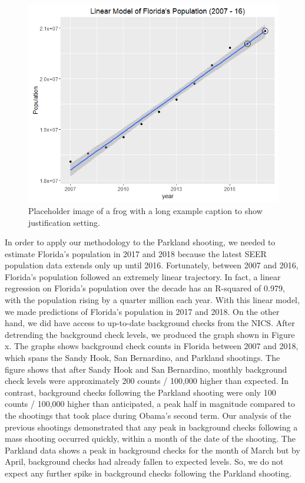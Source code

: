 \documentclass[9pt,twocolumn,twoside,lineno]{pnas-new}
\begin{document}
\begin{figure}
  \centering
  \includegraphics[width=\linewidth]{figures/florida}
  \caption{Placeholder image of a frog with a long example caption to show justification setting.}
  \label{fig:florida}
\end{figure}
	In order to apply our methodology to the Parkland shooting, we needed to estimate Florida’s population in 2017 and 2018 because the latest SEER population data extends only up until 2016. Fortunately, between 2007 and 2016, Florida’s population followed an extremely linear trajectory. In fact, a linear regression on Florida’s population over the decade has an R-squared of 0.979, with the population rising by a quarter million each year. With this linear model, we made predictions of Florida’s population in 2017 and 2018. On the other hand, we did have access to up-to-date background checks from the NICS. 
	After detrending the background check levels, we produced the graph shown in Figure x. The graphs shows background check counts in Florida between 2007 and 2018, which spans the Sandy Hook, San Bernardino, and Parkland shootings. The figure shows that after Sandy Hook and San Bernardino, monthly background check levels were approximately 200 counts / 100,000 higher than expected. In contrast, background checks following the Parkland shooting were only 100 counts / 100,000 higher than anticipated, a peak half in magnitude compared to the shootings that took place during Obama’s second term. Our analysis of the previous shootings demonstrated that any peak in background checks following a mass shooting occurred quickly, within a month of the date of the shooting. The Parkland data shows a peak in background checks for the month of March but by April, background checks had already fallen to expected levels. So, we do not expect any further spike in background checks following the Parkland shooting. 
\end{document}
